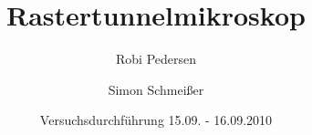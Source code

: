 \documentclass[a4paper,oneside]{scrartcl} %
\title{Rastertunnelmikroskop}
\author{Robi Pedersen \and Simon Schmeißer}
\date{Versuchsdurchführung 15.09. - 16.09.2010}
\begin{document}
\begin{titlepage}
  \maketitle
  \vfill
  \thispagestyle{empty}
\end{titlepage}

\tableofcontents
\clearpage









\clearpage

% 
%
\end{document}
